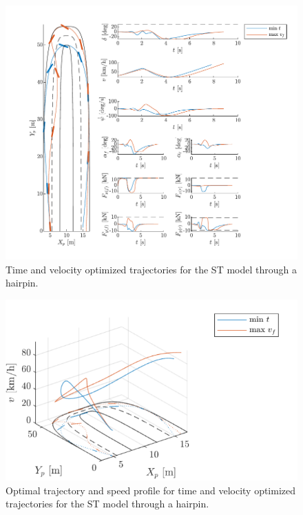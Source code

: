 \begin{figure}[h!]
    \centering
    \includegraphics{figures/pep1_part1.pdf}
    \caption{Time and velocity optimized trajectories for the ST model through a hairpin.}
    \label{fig:pep1_part1}
\end{figure}

\begin{figure}[h!]
    \centering
    \includegraphics{figures/pep1_part1_arp.pdf}
    \caption{Optimal trajectory and speed profile for time and velocity optimized trajectories for the ST model through a hairpin.}
    \label{fig:pep1_part1_arp}
\end{figure}

